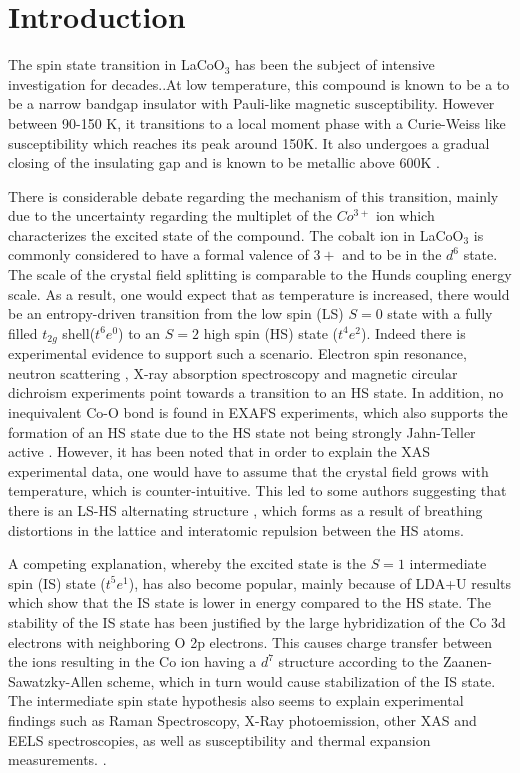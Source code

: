 \documentclass[10pt]{ruthesis}
\begin{document}
{\section{Introduction}
The spin state transition in LaCoO$_3$ has been the subject of  intensive investigation for decades.\cite{Heikes, Naiman, Goodenough}.At low temperature, this compound is known to be a to be a narrow bandgap insulator  with Pauli-like magnetic susceptibility. However between 90-150 K, it transitions to a local moment phase with a Curie-Weiss like susceptibility which reaches its peak around 150K. It also undergoes a gradual closing of the insulating gap and is known to be metallic above 600K \cite{BhideMoss, English, Saitoh}.

There is considerable debate regarding the mechanism of this transition, mainly due to the uncertainty regarding the multiplet of the $Co^{3+}$ ion which  characterizes the excited state of the compound.  The cobalt ion in LaCoO$_3$ is commonly considered to have a formal valence of $3+$ and to be in the $d^6$ state. The scale of the crystal field splitting is comparable to the Hunds coupling energy scale. As a result, one would expect that as temperature is increased, there would be an entropy-driven transition from the low spin (LS) $S=0$ state with a fully filled $t_{2g}$ shell($t^6e^0$) to an $S=2$ high spin (HS) state ($t^4e^2$)\cite{Goodenough}. Indeed there is experimental evidence to support such a scenario. Electron spin resonance\cite{Zopka}, neutron scattering \cite{Podlesnyak}, X-ray absorption spectroscopy and magnetic circular dichroism experiments\cite{Haverfort} point towards a transition to an HS state. In addition, no inequivalent Co-O bond is found in EXAFS experiments, which also supports the formation of an HS state due to the HS state not being strongly Jahn-Teller active \cite{Sundaram}. However, it has been noted that in order to explain the  XAS experimental data, one would have to assume that the crystal field grows with temperature, which is counter-intuitive.\cite{Eder, Haverfort} This led to some authors suggesting that there is an LS-HS alternating structure , which forms as a result of breathing distortions in the lattice \cite{Bari} \cite{Goodenough} and interatomic repulsion between the HS atoms.\cite{Asaka, Eder} 
 
A competing explanation, whereby the excited state is the $S=1$ intermediate spin (IS) state ($t^5e^1$), has also become popular\cite{Heikes, Radaelli}, mainly because of LDA+U results which show that the    
IS state is lower in energy compared to the HS state.\cite{Korotin, Pandey, Anisimov} The stability of the IS state has been justified by the large hybridization of the Co 3d electrons with neighboring O 2p electrons. This causes charge transfer between the ions resulting in the Co ion having a $d^7$ structure according to the Zaanen-Sawatzky-Allen scheme,\cite{Zaanen} which in turn would cause stabilization of the IS state. The intermediate spin state hypothesis also seems to explain experimental findings such as Raman Spectroscopy, X-Ray photoemission, other XAS and EELS spectroscopies, as well as susceptibility and thermal expansion measurements. \cite{Saitoh, Abbate, Masuda, Klie, Zobel, Gne, Maris, Vogt}. 

}
\end{document}
